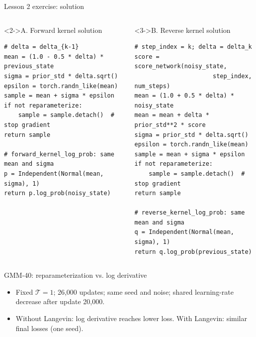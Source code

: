 \documentclass[aspectratio=169,10pt]{beamer}
\newcommand{\Tau}{\mathcal{T}}
\begin{document}
\begin{frame}[fragile]{Lesson 2 exercise: solution}
  \centering
  \vspace{0.06cm}

  \begin{columns}[T,onlytextwidth]
      \begin{block}<2->{A. Forward kernel solution}
\fontsize{6.2}{7.0}\selectfont
\begin{verbatim}
# delta = delta_{k-1}
mean = (1.0 - 0.5 * delta) * previous_state
sigma = prior_std * delta.sqrt()
epsilon = torch.randn_like(mean)
sample = mean + sigma * epsilon
if not reparameterize:
    sample = sample.detach()  # stop gradient
return sample

# forward_kernel_log_prob: same mean and sigma
p = Independent(Normal(mean, sigma), 1)
return p.log_prob(noisy_state)
\end{verbatim}
      \end{block}
      \begin{block}<3->{B. Reverse kernel solution}
\fontsize{6.2}{7.0}\selectfont
\begin{verbatim}
# step_index = k; delta = delta_k
score = score_network(noisy_state,
                      step_index, num_steps)
mean = (1.0 + 0.5 * delta) * noisy_state
mean = mean + delta * prior_std**2 * score
sigma = prior_std * delta.sqrt()
epsilon = torch.randn_like(mean)
sample = mean + sigma * epsilon
if not reparameterize:
    sample = sample.detach()  # stop gradient
return sample

# reverse_kernel_log_prob: same mean and sigma
q = Independent(Normal(mean, sigma), 1)
return q.log_prob(previous_state)
\end{verbatim}
      \end{block}
  \end{columns}
\end{frame}

\begin{frame}{GMM-40: reparameterization vs. log derivative}
  \centering
  
  \vspace{0.04cm}

  {\scriptsize
    \begin{itemize}
      \item Fixed $\Tau=1$; 26,000 updates; same seed and noise;
        shared learning-rate decrease after update 20,000.
      \item Without Langevin: log derivative reaches lower loss.
        With Langevin: similar final losses (one seed).
    \end{itemize}}
\end{frame}
\end{document}
